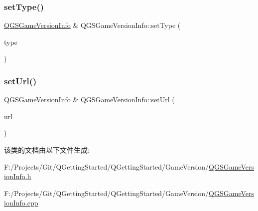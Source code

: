 \mbox{\label{class_q_g_s_game_version_info_aa320d2d4f2d8141f008092481bd9c0c0}} 
\subsubsection{\texorpdfstring{set\+Type()}{setType()}}
{\footnotesize\ttfamily \mbox{\hyperlink{class_q_g_s_game_version_info}{Q\+G\+S\+Game\+Version\+Info}} \& Q\+G\+S\+Game\+Version\+Info\+::set\+Type (\begin{DoxyParamCaption}\item[{const Q\+String \&}]{type }\end{DoxyParamCaption})}

\mbox{\label{class_q_g_s_game_version_info_a36f50364d5a01a024644a589ee7ed11b}} 
\subsubsection{\texorpdfstring{set\+Url()}{setUrl()}}
{\footnotesize\ttfamily \mbox{\hyperlink{class_q_g_s_game_version_info}{Q\+G\+S\+Game\+Version\+Info}} \& Q\+G\+S\+Game\+Version\+Info\+::set\+Url (\begin{DoxyParamCaption}\item[{const Q\+Url \&}]{url }\end{DoxyParamCaption})}



该类的文档由以下文件生成\+:\begin{DoxyCompactItemize}
\item 
F\+:/\+Projects/\+Git/\+Q\+Getting\+Started/\+Q\+Getting\+Started/\+Game\+Version/\mbox{\hyperlink{_q_g_s_game_version_info_8h}{Q\+G\+S\+Game\+Version\+Info.\+h}}\item 
F\+:/\+Projects/\+Git/\+Q\+Getting\+Started/\+Q\+Getting\+Started/\+Game\+Version/\mbox{\hyperlink{_q_g_s_game_version_info_8cpp}{Q\+G\+S\+Game\+Version\+Info.\+cpp}}\end{DoxyCompactItemize}
